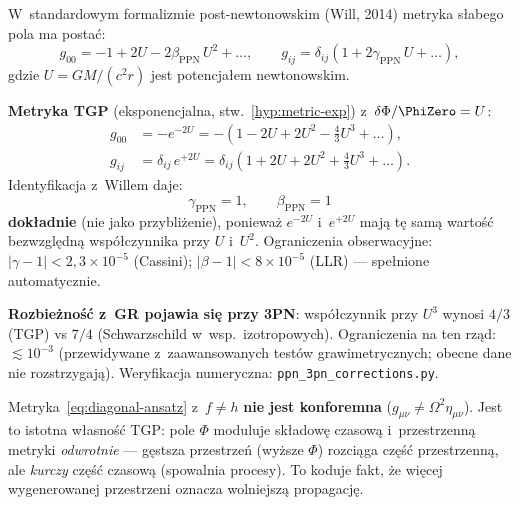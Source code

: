 \begin{remark}\label{rem:PPN-Will}
W~standardowym formalizmie post-newtonowskim (Will, 2014)
metryka s\l{}abego pola ma posta\'c:
\[
g_{00} = -1 + 2U - 2\beta_{\mathrm{PPN}}\,U^2 + \ldots,\qquad
g_{ij} = \delta_{ij}(1 + 2\gamma_{\mathrm{PPN}}\,U + \ldots),
\]
gdzie $U = GM/(c^2 r)$ jest potencja\l{}em newtonowskim.

\medskip\noindent
\textbf{Metryka TGP} (eksponencjalna, stw.~\ref{hyp:metric-exp})
z~$\delta\Phi/\PhiZero = U$:
\begin{align}
g_{00} &= -e^{-2U} = -(1 - 2U + 2U^2 - \tfrac{4}{3}U^3 + \ldots),\\
g_{ij} &= \delta_{ij}\,e^{+2U} = \delta_{ij}(1 + 2U + 2U^2 + \tfrac{4}{3}U^3 + \ldots).
\end{align}
Identyfikacja z~Willem daje:
\[
\boxed{\gamma_{\mathrm{PPN}} = 1,\qquad \beta_{\mathrm{PPN}} = 1}
\]
\textbf{dok\l{}adnie} (nie jako przybli\.zenie), poniewa\.z
$e^{-2U}$ i~$e^{+2U}$ maj\k{a} t\k{e} sam\k{a} warto\'s\'c bezwzgl\k{e}dn\k{a}
wsp\'o\l{}czynnika przy $U$ i~$U^2$.
Ograniczenia obserwacyjne:
$|\gamma - 1| < 2{,}3 \times 10^{-5}$ (Cassini);
$|\beta - 1| < 8 \times 10^{-5}$ (LLR) --- spe\l{}nione automatycznie.

\medskip\noindent
\textbf{Rozbie\.zno\'s\'c z~GR pojawia si\k{e} przy 3PN}:
wsp\'o\l{}czynnik przy $U^3$ wynosi $4/3$ (TGP) vs $7/4$ (Schwarzschild
w~wsp.\ izotropowych). Ograniczenia na ten rz\k{a}d:
$\lesssim 10^{-3}$ (przewidywane z~zaawansowanych test\'ow
grawimetrycznych; obecne dane nie rozstrzygaj\k{a}).
Weryfikacja numeryczna: \texttt{ppn\_3pn\_corrections.py}.
\end{remark}

\begin{remark}\label{rem:nie-konforemna}
Metryka~\eqref{eq:diagonal-ansatz} z~$f \neq h$
\textbf{nie jest konforemna} ($g_{\mu\nu} \neq \Omega^2\eta_{\mu\nu}$).
Jest to istotna w\l{}asno\'s\'c TGP: pole $\Phi$ moduluje
sk\l{}adow\k{e} czasow\k{a} i~przestrzenn\k{a} metryki
\emph{odwrotnie} --- g\k{e}stsza przestrze\'n (wy\.zsze $\Phi$)
rozci\k{a}ga cz\k{e}\'s\'c przestrzenn\k{a},
ale \emph{kurczy} cz\k{e}\'s\'c czasow\k{a}
(spowalnia procesy). To koduje fakt, \.ze
wi\k{e}cej wygenerowanej przestrzeni oznacza
wolniejsz\k{a} propagacj\k{e}.
\end{remark}

